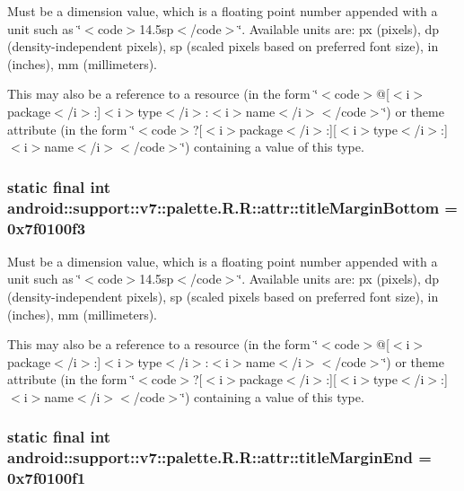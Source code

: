 Must be a dimension value, which is a floating point number appended with a unit such as \char`\"{}$<$code$>$14.5sp$<$/code$>$\char`\"{}. Available units are: px (pixels), dp (density-independent pixels), sp (scaled pixels based on preferred font size), in (inches), mm (millimeters). 

This may also be a reference to a resource (in the form \char`\"{}$<$code$>$@\mbox{[}$<$i$>$package$<$/i$>$:\mbox{]}$<$i$>$type$<$/i$>$:$<$i$>$name$<$/i$>$$<$/code$>$\char`\"{}) or theme attribute (in the form \char`\"{}$<$code$>$?\mbox{[}$<$i$>$package$<$/i$>$:\mbox{]}\mbox{[}$<$i$>$type$<$/i$>$:\mbox{]}$<$i$>$name$<$/i$>$$<$/code$>$\char`\"{}) containing a value of this type. \hypertarget{classandroid_1_1support_1_1v7_1_1palette_1_1_r_1_1attr_258df0951fef6117ddd10d18dd1c796e}{
\subsubsection[{titleMarginBottom}]{\setlength{\rightskip}{0pt plus 5cm}static final int android::support::v7::palette.R.R::attr::titleMarginBottom = 0x7f0100f3}}
\label{classandroid_1_1support_1_1v7_1_1palette_1_1_r_1_1attr_258df0951fef6117ddd10d18dd1c796e}


Must be a dimension value, which is a floating point number appended with a unit such as \char`\"{}$<$code$>$14.5sp$<$/code$>$\char`\"{}. Available units are: px (pixels), dp (density-independent pixels), sp (scaled pixels based on preferred font size), in (inches), mm (millimeters). 

This may also be a reference to a resource (in the form \char`\"{}$<$code$>$@\mbox{[}$<$i$>$package$<$/i$>$:\mbox{]}$<$i$>$type$<$/i$>$:$<$i$>$name$<$/i$>$$<$/code$>$\char`\"{}) or theme attribute (in the form \char`\"{}$<$code$>$?\mbox{[}$<$i$>$package$<$/i$>$:\mbox{]}\mbox{[}$<$i$>$type$<$/i$>$:\mbox{]}$<$i$>$name$<$/i$>$$<$/code$>$\char`\"{}) containing a value of this type. \hypertarget{classandroid_1_1support_1_1v7_1_1palette_1_1_r_1_1attr_39e2b92299203c895866d133099914aa}{
\subsubsection[{titleMarginEnd}]{\setlength{\rightskip}{0pt plus 5cm}static final int android::support::v7::palette.R.R::attr::titleMarginEnd = 0x7f0100f1}}
\label{classandroid_1_1support_1_1v7_1_1palette_1_1_r_1_1attr_39e2b92299203c895866d133099914aa}


